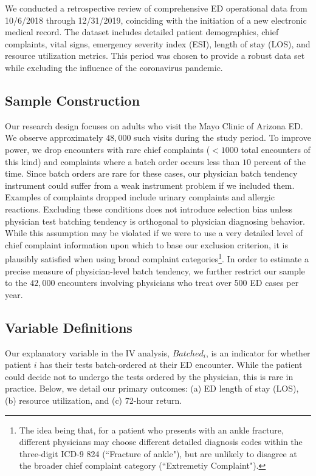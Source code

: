 \documentclass[,,nonblindrev]{informs}
\begin{document}
We conducted a retrospective review of comprehensive ED operational data
from 10/6/2018 through 12/31/2019, coinciding with the initiation of a
new electronic medical record. The dataset includes detailed patient
demographics, chief complaints, vital signs, emergency severity index
(ESI), length of stay (LOS), and resource utilization metrics. This
period was chosen to provide a robust data set while excluding the
influence of the coronavirus pandemic.

\hypertarget{sample-construction}{%
\subsection{Sample Construction}\label{sample-construction}}

Our research design focuses on adults who visit the Mayo Clinic of
Arizona ED. We observe approximately \(48,000\) such visits during the
study period. To improve power, we drop encounters with rare chief
complaints (\(<1000\) total encounters of this kind) and complaints
where a batch order occurs less than \(10\) percent of the time. Since
batch orders are rare for these cases, our physician batch tendency
instrument could suffer from a weak instrument problem if we included
them. Examples of complaints dropped include urinary complaints and
allergic reactions. Excluding these conditions does not introduce
selection bias unless physician test batching tendency is orthogonal to
physician diagnosing behavior. While this assumption may be violated if
we were to use a very detailed level of chief complaint information upon
which to base our exclusion criterion, it is plausibly satisfied when
using broad complaint
categories\footnote{The idea being that, for a patient who presents with an ankle fracture, different physicians may choose different detailed diagnosis codes within the three-digit ICD-9 824 (``Fracture of ankle"), but are unlikely to disagree at the broader chief complaint category (``Extremetiy Complaint").}.
In order to estimate a precise measure of physician-level batch
tendency, we further restrict our sample to the \(42,000\) encounters
involving physicians who treat over 500 ED cases per year.

\hypertarget{variable-definitions}{%
\subsection{Variable Definitions}\label{variable-definitions}}

Our explanatory variable in the IV analysis, \(Batched_i\), is an
indicator for whether patient \(i\) has their tests batch-ordered at
their ED encounter. While the patient could decide not to undergo the
tests ordered by the physician, this is rare in practice. Below, we
detail our primary outcomes: (a) ED length of stay (LOS), (b) resource
utilization, and (c) 72-hour return.
\end{document}
